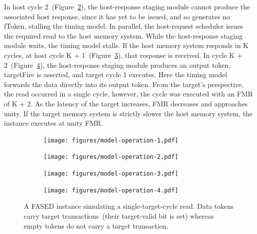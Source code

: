 In host cycle 2~(Figure~\ref{fig:model-operation-2}), the host-response staging module
cannot produce the associated host response, since it has yet to
be issued, and so generates no fToken, stalling the timing model.
In parallel, the host-request scheduler issues the required read to
the host memory system. While the host-response staging module
waits, the timing model stalls. If the host memory system responds
in K cycles, at host cycle K + 1~(Figure~\ref{fig:model-operation-3}), that response is received.
In cycle K + 2~(Figure~\ref{fig:model-operation-4}), the host-response staging module
produces an output token, targetFire is asserted, and target cycle
1 executes. Here the timing model forwards the data directly into
its output token. From the target’s perspective, the read occurred
in a single cycle, however, the cycle was executed with an FMR of
K + 2. As the latency of the target increases, FMR decreases and
approaches unity. If the target memory system is strictly slower
the host memory system, the instance executes at unity FMR.

\begin{figure}[t]
    \vspace{-0.25in}
	\centering
    \begin{subfigure}[t]{0.23\textwidth}
        \texttt{[image: figures/model-operation-1.pdf]}
        \caption{}
        \label{fig:model-operation-1}
    \end{subfigure}
    \begin{subfigure}[t]{0.24\textwidth}
        \texttt{[image: figures/model-operation-2.pdf]}
        \caption{}
        \label{fig:model-operation-2}
    \end{subfigure}
    \begin{subfigure}[t]{0.24\textwidth}
        \texttt{[image: figures/model-operation-3.pdf]}
        \caption{}
        \label{fig:model-operation-3}
    \end{subfigure}
    \begin{subfigure}[t]{0.23\textwidth}
        \texttt{[image: figures/model-operation-4.pdf]}
        \caption{}
        \label{fig:model-operation-4}
    \end{subfigure}
	\centering
    \caption{A FASED instance simulating a single-target-cycle read. Data
    tokens carry target transactions~(their target-valid bit is set) whereas
    empty tokens do not carry a target transaction.}
    \label{fig:model-operation}
\vspace{-0.20in}
\end{figure}

